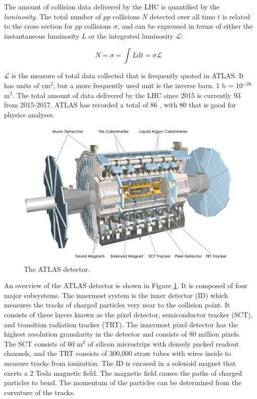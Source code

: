 The amount of \pp collision data delivered by the LHC is quantified by the \textit{luminosity}. The total number of $pp$ collisions $N$ detected over all time $t$ is related to the cross section for $pp$ collisions $\sigma$, and can be expressed in terms of either the instantaneous luminosity $L$ or the integrated luminosity $\mathcal{L}$:

\begin{equation}
N = \sigma = \int{L} \text{d}t = \sigma \mathcal{L}
\end{equation}

\noindent $\mathcal{L}$ is the measure of total data collected that is frequently quoted in ATLAS. It has units of cm$^2$, but a more frequently used unit is the inverse barn. 1 b = 10$^{-28}$ m$^2$. The total amount of data delivered by the LHC since 2015 is currently 93 \ifb from 2015-2017. ATLAS has recorded a total of 86 \ifb, with 80 \ifb that is good for physics analyses.

\begin{figure}[htb]
\centering
\includegraphics[width=1\textwidth]{Figures/atlas.jpg}
\caption{The ATLAS detector.}
\label{fig:atlas}
\end{figure}

An overview of the ATLAS detector is shown in Figure \ref{fig:atlas}. It is composed of four major subsystems. The innermost system is the inner detector (ID) which measures the tracks of charged particles very near to the collision point. It consists of three layers known as the pixel detector, semiconductor tracker (SCT), and transition radiation tracker (TRT). The innermost pixel detector has the highest resolution granularity in the detector and consists of 80 million pixels. The SCT consists of 60 m$^2$ of silicon microstrips with densely packed readout channels, and the TRT consists of 300,000 straw tubes with wires inside to measure tracks from ionization. The ID is encased in a solenoid magnet that exerts a 2 Tesla magnetic field. The magnetic field causes the paths of charged particles to bend. The momentum of the particles can be determined from the curvature of the tracks.

